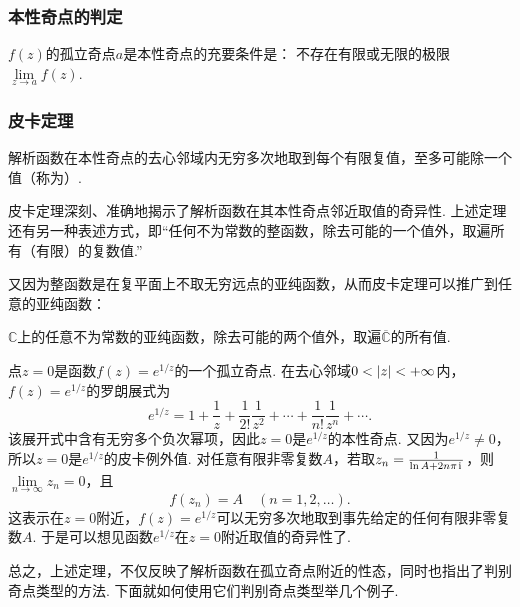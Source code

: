 \subsubsection{本性奇点的判定}
\begin{theorem}
\(f(z)\)的孤立奇点\(a\)是本性奇点的充要条件是：
不存在有限或无限的极限\(\lim\limits_{z \to a} f(z)\).
\end{theorem}

\subsubsection{皮卡定理}
\begin{theorem}[皮卡（Picard）定理]
解析函数在本性奇点的去心邻域内无穷多次地取到每个有限复值，至多可能除一个值（称为）.
\end{theorem}
皮卡定理深刻、准确地揭示了解析函数在其本性奇点邻近取值的奇异性.
上述定理还有另一种表述方式，即“任何不为常数的整函数，除去可能的一个值外，取遍所有（有限）的复数值.”

又因为整函数是在复平面上不取无穷远点的亚纯函数，从而皮卡定理可以推广到任意的亚纯函数：\begin{theorem}
\(\mathbb{C}\)上的任意不为常数的亚纯函数，除去可能的两个值外，取遍\(\overline{\mathbb{C}}\)的所有值.
\end{theorem}

\begin{example}
点\(z=0\)是函数\(f(z) = e^{1/z}\)的一个孤立奇点.
在去心邻域\(0<\abs{z}<+\infty\)内，\(f(z) = e^{1/z}\)的罗朗展式为\[
e^{1/z} = 1 + \frac{1}{z} + \frac{1}{2!} \frac{1}{z^2} + \dotsb + \frac{1}{n!} \frac{1}{z^n} + \dotsb.
\]该展开式中含有无穷多个负次幂项，因此\(z=0\)是\(e^{1/z}\)的本性奇点.
又因为\(e^{1/z}\neq0\)，所以\(z=0\)是\(e^{1/z}\)的皮卡例外值.
对任意有限非零复数\(A\)，若取\(z_n = \frac{1}{\ln A + 2n\pi\kern1pt\mathrm{i}\kern1pt}\)，则\(\lim\limits_{n\to\infty} z_n = 0\)，且\[
f(z_n) = A
\quad(n=1,2,\dotsc).
\]这表示在\(z=0\)附近，\(f(z) = e^{1/z}\)可以无穷多次地取到事先给定的任何有限非零复数\(A\).
于是可以想见函数\(e^{1/z}\)在\(z=0\)附近取值的奇异性了.
\end{example}

总之，上述定理，不仅反映了解析函数在孤立奇点附近的性态，同时也指出了判别奇点类型的方法.
下面就如何使用它们判别奇点类型举几个例子.

